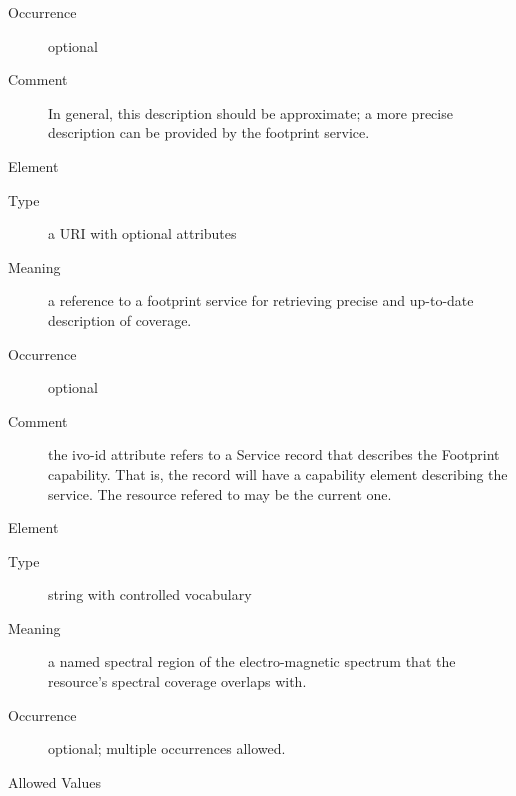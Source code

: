 \documentclass[11pt,a4paper]{ivoa}
\begin{document}
\begin{generated}
\begin{bigdescription}
\begin{description}
\item[Occurrence] optional
\item[Comment] 
                 In general, this description should be approximate; a
                 more precise description can be provided by the 
                 footprint service.  
               

\end{description}
\item[Element \xmlel{footprint}]
\begin{description}
\item[Type] a URI with optional attributes
\item[Meaning] 
                  a reference to a footprint service for retrieving 
                  precise and up-to-date description of coverage.  
               
\item[Occurrence] optional
\item[Comment] 
                  the ivo-id attribute refers to a Service record
                  that describes the Footprint capability.  That is,
                  the record will have a capability element describing
                  the service.  The resource refered to may be the 
                  current one.  
               

\end{description}
\item[Element \xmlel{waveband}]
\begin{description}
\item[Type] string with controlled vocabulary
\item[Meaning] 
                  a named spectral region of the electro-magnetic spectrum 
                  that the resource's spectral coverage overlaps with.
               
\item[Occurrence] optional; multiple occurrences allowed.

\item[Allowed Values]\hfil
{}
\end{description}
\end{bigdescription}
\end{generated}
\end{document}
